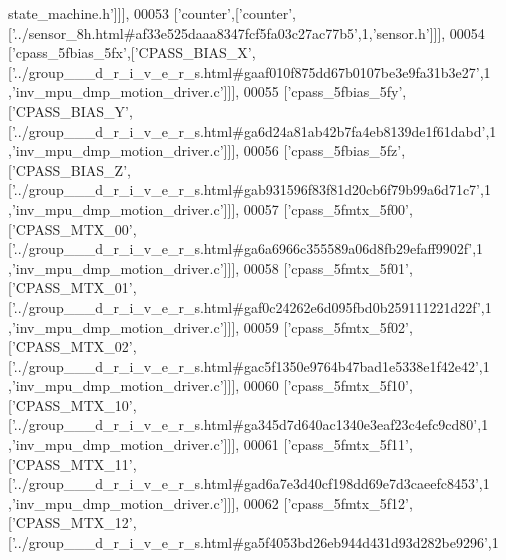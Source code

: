 \begin{DoxyCode}
{      state\_machine.h'}]]],
00053   [\textcolor{stringliteral}{'counter'},[\textcolor{stringliteral}{'counter'},[\textcolor{stringliteral}{'../sensor\_8h.html#af33e525daaa8347fcf5fa03c27ac77b5'},1,\textcolor{stringliteral}{'sensor.h'}]]],
00054   [\textcolor{stringliteral}{'cpass\_5fbias\_5fx'},[\textcolor{stringliteral}{'CPASS\_BIAS\_X'},[\textcolor{stringliteral}{'../group\_\_\_d\_r\_i\_v\_e\_r\_s.html#gaaf010f875dd67b0107be3e9fa31b3e27'},1
      ,\textcolor{stringliteral}{'inv\_mpu\_dmp\_motion\_driver.c'}]]],
00055   [\textcolor{stringliteral}{'cpass\_5fbias\_5fy'},[\textcolor{stringliteral}{'CPASS\_BIAS\_Y'},[\textcolor{stringliteral}{'../group\_\_\_d\_r\_i\_v\_e\_r\_s.html#ga6d24a81ab42b7fa4eb8139de1f61dabd'},1
      ,\textcolor{stringliteral}{'inv\_mpu\_dmp\_motion\_driver.c'}]]],
00056   [\textcolor{stringliteral}{'cpass\_5fbias\_5fz'},[\textcolor{stringliteral}{'CPASS\_BIAS\_Z'},[\textcolor{stringliteral}{'../group\_\_\_d\_r\_i\_v\_e\_r\_s.html#gab931596f83f81d20cb6f79b99a6d71c7'},1
      ,\textcolor{stringliteral}{'inv\_mpu\_dmp\_motion\_driver.c'}]]],
00057   [\textcolor{stringliteral}{'cpass\_5fmtx\_5f00'},[\textcolor{stringliteral}{'CPASS\_MTX\_00'},[\textcolor{stringliteral}{'../group\_\_\_d\_r\_i\_v\_e\_r\_s.html#ga6a6966c355589a06d8fb29efaff9902f'},1
      ,\textcolor{stringliteral}{'inv\_mpu\_dmp\_motion\_driver.c'}]]],
00058   [\textcolor{stringliteral}{'cpass\_5fmtx\_5f01'},[\textcolor{stringliteral}{'CPASS\_MTX\_01'},[\textcolor{stringliteral}{'../group\_\_\_d\_r\_i\_v\_e\_r\_s.html#gaf0c24262e6d095fbd0b259111221d22f'},1
      ,\textcolor{stringliteral}{'inv\_mpu\_dmp\_motion\_driver.c'}]]],
00059   [\textcolor{stringliteral}{'cpass\_5fmtx\_5f02'},[\textcolor{stringliteral}{'CPASS\_MTX\_02'},[\textcolor{stringliteral}{'../group\_\_\_d\_r\_i\_v\_e\_r\_s.html#gac5f1350e9764b47bad1e5338e1f42e42'},1
      ,\textcolor{stringliteral}{'inv\_mpu\_dmp\_motion\_driver.c'}]]],
00060   [\textcolor{stringliteral}{'cpass\_5fmtx\_5f10'},[\textcolor{stringliteral}{'CPASS\_MTX\_10'},[\textcolor{stringliteral}{'../group\_\_\_d\_r\_i\_v\_e\_r\_s.html#ga345d7d640ac1340e3eaf23c4efc9cd80'},1
      ,\textcolor{stringliteral}{'inv\_mpu\_dmp\_motion\_driver.c'}]]],
00061   [\textcolor{stringliteral}{'cpass\_5fmtx\_5f11'},[\textcolor{stringliteral}{'CPASS\_MTX\_11'},[\textcolor{stringliteral}{'../group\_\_\_d\_r\_i\_v\_e\_r\_s.html#gad6a7e3d40cf198dd69e7d3caeefc8453'},1
      ,\textcolor{stringliteral}{'inv\_mpu\_dmp\_motion\_driver.c'}]]],
00062   [\textcolor{stringliteral}{'cpass\_5fmtx\_5f12'},[\textcolor{stringliteral}{'CPASS\_MTX\_12'},[\textcolor{stringliteral}{'../group\_\_\_d\_r\_i\_v\_e\_r\_s.html#ga5f4053bd26eb944d431d93d282be9296'},1

\end{DoxyCode}
